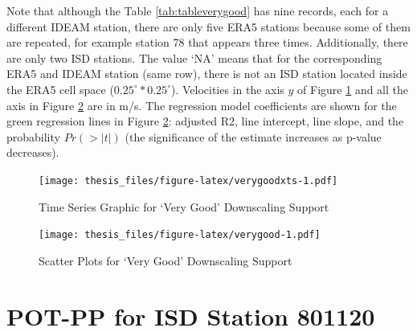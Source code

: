 \documentclass[12pt,oneside]{reedthesis}
\begin{document}
Note that although the Table \ref{tab:tableverygood} has nine records, each for a different IDEAM station, there are only five ERA5 stations because some of them are repeated, for example station 78 that appears three times. Additionally, there are only two ISD stations. The value `NA' means that for the corresponding ERA5 and IDEAM station (same row), there is not an ISD station located inside the ERA5 cell space (\(0.25^\circ * 0.25^\circ\)). Velocities in the axis \(y\) of Figure \ref{fig:verygoodxts} and all the axis in Figure \ref{fig:verygood} are in m/s. The regression model coefficients are shown for the green regression lines in Figure \ref{fig:verygood}: adjusted R2, line intercept, line slope, and the probability \(Pr(>|t|)\) (the significance of the estimate increases as p-value decreases).
\begin{figure}
\centering
\texttt{[image: thesis\_files/figure-latex/verygoodxts-1.pdf]}
\caption{\label{fig:verygoodxts}Time Series Graphic for `Very Good' Downscaling Support}
\end{figure}
\begin{figure}
\centering
\texttt{[image: thesis\_files/figure-latex/verygood-1.pdf]}
\caption{\label{fig:verygood}Scatter Plots for `Very Good' Downscaling Support}
\end{figure}
\hypertarget{pot-pp-for-isd-station-801120}{%
\section{POT-PP for ISD Station 801120}\label{pot-pp-for-isd-station-801120}}
\end{document}
